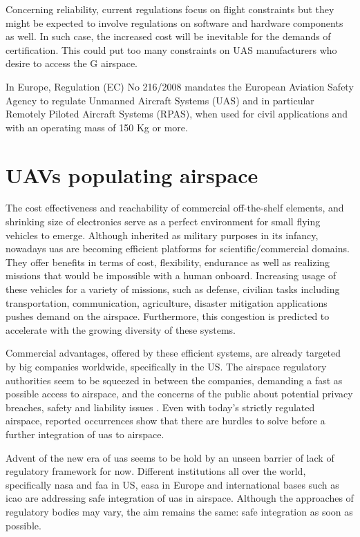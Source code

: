 Concerning reliability, current regulations focus on flight constraints but they might be 
expected to involve regulations on software and hardware components as well. 
In such case, the increased cost will be inevitable for the demands of certification. 
This could put too many constraints on UAS manufacturers who desire to access the G airspace. 

In Europe, Regulation (EC) No 216/2008 mandates the European Aviation Safety Agency 
to regulate Unmanned Aircraft Systems (UAS) and in particular Remotely Piloted Aircraft 
Systems (RPAS), when used for civil applications and with an operating mass of 150 Kg or more.

\section{UAVs populating airspace}\label{ch2:certificationOfAnalyticalApproaches}

The cost effectiveness and reachability of commercial off-the-shelf elements, and 
shrinking size of electronics serve as a perfect environment for small flying vehicles 
to emerge. Although inherited as military purposes in its infancy, nowadays \gls{uas} 
are becoming efficient platforms for scientific/commercial domains. They offer 
benefits in terms of cost, flexibility, endurance as well as realizing missions that 
would be impossible with a human onboard. 
Increasing usage of these vehicles for a variety of missions, such as defense, 
civilian tasks including transportation, communication, agriculture, disaster mitigation 
applications pushes demand on the airspace. Furthermore, this congestion is predicted 
to accelerate with the growing diversity of these systems. 

Commercial advantages, offered by these efficient systems, are already targeted by 
big companies worldwide, specifically in the US. The airspace regulatory authorities 
seem to be squeezed in between the companies, demanding a fast as possible 
access to airspace, and the concerns of the public about potential privacy breaches, 
safety and liability issues \cite{droneDisasters,droneImageProblem}. Even with today's 
strictly regulated airspace, reported occurrences show that there are hurdles to solve 
before a further integration of \gls{uas} to airspace.

Advent of the new era of \gls{uas} seems to be hold by an unseen barrier of lack of 
regulatory framework for now. Different institutions all over the world, specifically \gls{nasa} 
and faa in US, easa in Europe and international bases such as \gls{icao} are addressing 
safe integration of \gls{uas} in airspace. Although the approaches of regulatory bodies 
may vary, the aim remains the same: safe integration as soon as possible. 

